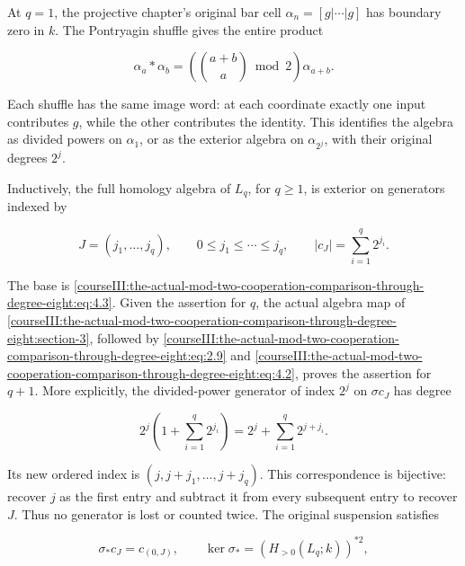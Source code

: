 At \(q=1\), the projective chapter's original bar cell \(\alpha_n=[g|\cdots|g]\) has boundary zero in \(k\). The Pontryagin shuffle gives the entire product

\begin{equation}
\alpha_a\ast\alpha_b=\left(\binom{a+b}{a}\bmod2\right)\alpha_{a+b}.
\label{courseIII:the-actual-mod-two-cooperation-comparison-through-degree-eight:eq:4.3}
\end{equation}

Each shuffle has the same image word: at each coordinate exactly one input contributes \(g\), while the other contributes the identity. This identifies the algebra as divided powers on \(\alpha_1\), or as the exterior algebra on \(\alpha_{2^j}\), with their original degrees \(2^j\).

Inductively, the full homology algebra of \(L_q\), for \(q\geq1\), is exterior on generators indexed by

\begin{equation}
J=(j_1,\ldots,j_q),\qquad
0\leq j_1\leq\cdots\leq j_q,
\qquad |c_J|=\sum_{i=1}^q2^{j_i}.
\label{courseIII:the-actual-mod-two-cooperation-comparison-through-degree-eight:eq:4.4}
\end{equation}

The base is \eqref{courseIII:the-actual-mod-two-cooperation-comparison-through-degree-eight:eq:4.3}. Given the assertion for \(q\), the actual algebra map of \cref{courseIII:the-actual-mod-two-cooperation-comparison-through-degree-eight:section-3}, followed by \eqref{courseIII:the-actual-mod-two-cooperation-comparison-through-degree-eight:eq:2.9} and \eqref{courseIII:the-actual-mod-two-cooperation-comparison-through-degree-eight:eq:4.2}, proves the assertion for \(q+1\). More explicitly, the divided-power generator of index \(2^j\) on \(\sigma c_J\) has degree

\begin{equation}
2^j\left(1+\sum_{i=1}^q2^{j_i}\right)
 =2^j+\sum_{i=1}^q2^{j+j_i}.
\label{courseIII:the-actual-mod-two-cooperation-comparison-through-degree-eight:eq:4.5}
\end{equation}

Its new ordered index is \((j,j+j_1,\ldots,j+j_q)\). This correspondence is bijective: recover \(j\) as the first entry and subtract it from every subsequent entry to recover \(J\). Thus no generator is lost or counted twice. The original suspension satisfies

\begin{equation}
\sigma_*c_J=c_{(0,J)},
\qquad
\ker\sigma_*=(H_{>0}(L_q;k))^{\ast2},
\label{courseIII:the-actual-mod-two-cooperation-comparison-through-degree-eight:eq:4.6}
\end{equation}

